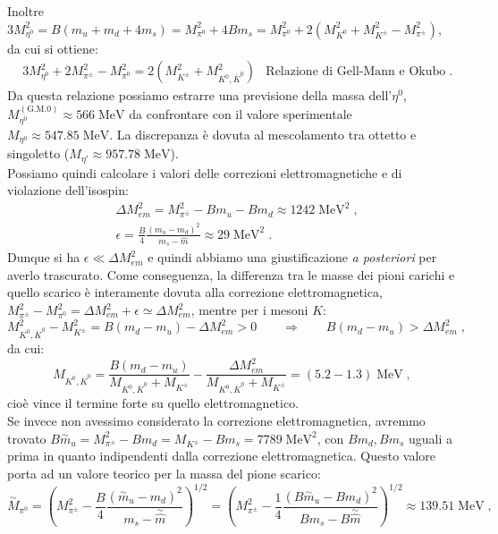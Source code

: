 \documentclass[12pt,a4paper]{article}
\theoremstyle{definition}
\numberwithin{equation}{section}
\begin{document}
Inoltre $3M_{\eta^0}^2=B(m_u+m_d+4m_s)=M_{\pi^0}^2+4Bm_s=M_{\pi^0}^2+2(M_{K^0}^2+M_{K^{\pm}}^2-M_{\pi^{\pm}}^2)$, da cui si ottiene:
\begin{align}
&3M_{\eta^0}^2+2M^2_{\pi^{\pm}}-M_{\pi^0}^2=2(M_{K^{\pm}}^2+M^2_{K^0,\overline{K}^0}) &\mbox{Relazione di Gell-Mann e Okubo}\;.
\end{align}
Da questa relazione possiamo estrarre una previsione della massa dell'$\eta^0$, $M^{(\mathrm{G.M.0})}_{\eta^0}\approx 566\;\mathrm{MeV}$ da confrontare con il valore sperimentale $M_{\eta^0}\approx 547.85\;\mathrm{MeV}$. La discrepanza è dovuta al mescolamento tra ottetto e singoletto ($M_{\eta'}\approx 957.78\;\mathrm{MeV}$). \\
Possiamo quindi calcolare i valori delle correzioni elettromagnetiche e di violazione dell'isospin:
\begin{align*}
&\Delta M^2_{em}=M_{\pi^{\pm}}^2-Bm_u-Bm_d\approx 1242\;\mathrm{MeV}^2\;, \\
&\epsilon=\frac{B}{4}\frac{(m_u-m_d)^2}{m_s-\hat{m}}\approx 29\;\mathrm{MeV}^2\;.
\end{align*}
Dunque si ha $\epsilon\ll \Delta M_{em}^2$ e quindi abbiamo una giustificazione \emph{a posteriori} per averlo trascurato. Come conseguenza, la differenza tra le masse dei pioni carichi e quello scarico è interamente dovuta alla correzione elettromagnetica, $M^2_{\pi^{\pm}}-M^2_{\pi^0}=\Delta M^2_{em}+\epsilon\simeq \Delta M^2_{em}$, mentre per i mesoni $K$:
$$
M^2_{K^0,\overline{K}^0}-M^2_{K^{\pm}}=B(m_d-m_u)-\Delta M^2_{em}>0\qquad \Longrightarrow\qquad B(m_d-m_u)>\Delta M^2_{em}\;,
$$
da cui:
\begin{equation}
M_{K^0,\overline{K}^0}=\frac{B(m_d-m_u)}{M_{K^0,\overline{K}^0}+M_{K^{\pm}}}-\frac{\Delta M^2_{em}}{M_{K^0,\overline{K}^0}+M_{K^{\pm}}}=(5.2-1.3)\;\mathrm{MeV}\;,
\end{equation}
cioè vince il termine forte su quello elettromagnetico. \\
Se invece non avessimo considerato la correzione elettromagnetica, avremmo trovato $B\stackrel{\sim}{m}_u=M_{\pi^{\pm}}^2-Bm_d=M_{K^{\pm}}-Bm_s=7789\; \mathrm{MeV}^2$, con $Bm_d,Bm_s$ uguali a prima in quanto indipendenti dalla correzione elettromagnetica. Questo valore porta ad un valore teorico per la massa del pione scarico:
\begin{equation}
\stackrel{\sim}{M}_{\pi^0}=\left(M_{\pi^{\pm}}^2-\frac{B}{4}\frac{(\stackrel{\sim}{m}_u-m_d)^2}{m_s-\stackrel{\sim}{\hat{m}}}\right)^{1/2}=\left(M_{\pi^{\pm}}^2-\frac{1}{4}\frac{(B\stackrel{\sim}{m}_u-Bm_d)^2}{Bm_s-B\stackrel{\sim}{\hat{m}}}\right)^{1/2}\approx 139.51\; \mathrm{MeV}\;,
\end{equation}
\end{document}
